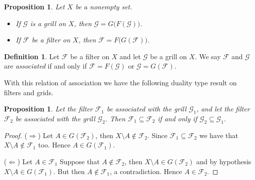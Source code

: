 \documentclass[12pt]{article}
\theoremstyle{plain}
\newtheorem{prop}[thm]{Proposition}
\theoremstyle{definition}
\newtheorem{defn}[thm]{Definition}
\newcommand{\calF}{\mathcal{F}}
\newcommand{\calG}{\mathcal{G}}
\begin{document}
\begin{prop}
  Let $X$ be a nonempty set.
  \begin{itemize}
    \item[(a)] If $\calG$ is a grill on $X$, then $\calG =
      G\bigl(F(\calG)\bigr)$.
    
    \item[(b)] If $\calF$ be a filter on $X$, then $\calF =
      F\bigl(G(\calF)\bigr)$.
  \end{itemize}
\end{prop}

\begin{defn}
  Let $\calF$ be a filter on $X$ and let $\calG$ be a grill on $X$.
  We say $\calF$ and $\calG$ are \textsl{associated} if and only if
  $\calF = F(\calG)$ or $\calG = G(\calF)$. 
\end{defn}

With this relation of association we have the following duality type
result on filters and grids.

\begin{prop}
  Let the filter $\calF_1$ be associated with the grill $\calG_1$, and
  let the filter $\calF_2$ be associated with the grill $\calG_2$.
  Then $\calF_1 \subseteq \calF_2$ if and only if $\calG_2 \subseteq \calG_1$.
\end{prop}
\begin{proof}
  ($\Rightarrow$)
  Let $A \in G(\calF_2)$, then $X \setminus A \not\in \calF_2$.
  Since $\calF_1 \subseteq \calF_2$ we have that $X \setminus A \not\in
  \calF_1$ too.
  Hence $A \in G(\calF_1)$.

  ($\Leftarrow$)
  Let $A \in \calF_1$
  Suppose that $A \not\in \calF_2$, then $X \setminus A \in
  G(\calF_2)$ and by hypothesis $X \setminus A \in G(\calF_1)$.
  But then $A \not\in \calF_1$, a contradiction.
  Hence $A \in \calF_2$.
\end{proof}
\end{document}
